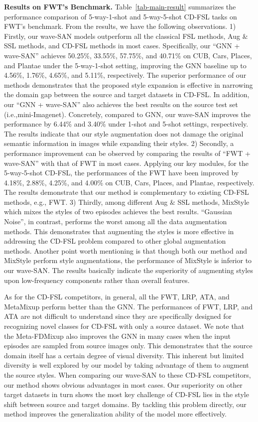 \documentclass{article}
\begin{document}
	
\noindent\textbf{Results on FWT's Benchmark.} Table~\ref{tab-main-result} summarizes the performance comparison of 5-way-1-shot and 5-way-5-shot CD-FSL tasks on FWT's benchmark. 
From the results, we have the following observations. 1) Firstly, our wave-SAN models outperform all the classical FSL methods, Aug $\&$ SSL methods, and CD-FSL methods in most cases. Specifically, our ``GNN + wave-SAN'' achieves 50.25\%, 33.55\%, 57.75\%, and 40.71\% on CUB, Cars, Places, and Plantae under the 5-way-1-shot setting, improving the GNN baseline up to 4.56\%, 1.76\%, 4.65\%, and 5.11\%, respectively. The superior performance of our methods demonstrates that the proposed style expansion is effective in narrowing the domain gap between the source and target datasets in CD-FSL. 
In addition, our ``GNN + wave-SAN'' also achieves the best results on the source test set (i.e.,mini-Imagenet). Concretely, compared to GNN, our wave-SAN improves the performance by 6.44\% and 3.40\% under 1-shot and 5-shot settings, respectively. The results indicate that our style augmentation does not damage the original semantic information in images while expanding their styles. 
2) Secondly, a performance improvement can be observed by comparing the results of ``FWT + wave-SAN'' with that of FWT in most cases. Applying our key modules, for the 5-way-5-shot CD-FSL, the performances of the FWT have been improved by 4.18\%, 2.88\%, 4.25\%, and 4.00\% on CUB, Cars, Places, and Plantae, respectively. The results demonstrate that our method is complementary to existing CD-FSL methods, e.g., FWT. 
3) Thirdly, among different Aug $\&$ SSL methods, MixStyle which mixes the styles of two episodes achieves the best results. ``Gaussian Noise'', in contrast, performs the worst among all the data augmentation methods. This demonstrates that augmenting the styles is more effective in addressing the CD-FSL problem compared to other global augmentation methods. Another point worth mentioning is that though both our method and MixStyle perform style augmentations, the performance of MixStyle is inferior to our wave-SAN. The results basically indicate the superiority of augmenting styles upon low-frequency components rather than overall features. 

As for the CD-FSL competitors, in general, all the FWT, LRP, ATA, and MetaMixup perform better than the GNN. The performances of FWT, LRP, and ATA are not difficult to understand since they are specifically designed for recognizing novel classes for CD-FSL with only a source dataset. We note that the Meta-FDMixup also improves the GNN in many cases when the input episodes are sampled from source images only. This demonstrates that the source domain itself has a certain degree of visual diversity. This inherent but limited diversity is well explored by our model by taking advantage of them to augment the source styles. When comparing our wave-SAN to these CD-FSL competitors, our method shows obvious advantages in most cases. 
Our superiority on other target datasets in turn shows the most key challenge of CD-FSL lies in the style shift between source and target domains. By tackling this problem directly, our method improves the generalization ability of the model more effectively.
\end{document}
